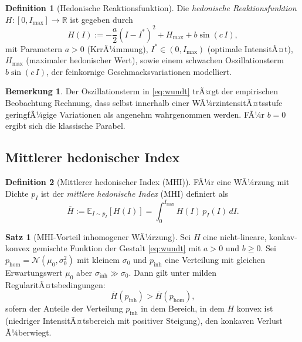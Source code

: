 ﻿\documentclass[12pt,a4paper]{article}
\theoremstyle{definition}
\newtheorem{definition}{Definition}[section]
\newtheorem{theorem}{Satz}[section]
\newtheorem{remark}{Bemerkung}[section]
\newcommand{\R}{\mathbb{R}}
\newcommand{\E}{\mathbb{E}}
\newcommand{\MHI}{\overline{H}}
\begin{document}
\begin{definition}[Hedonische Reaktionsfunktion]
Die \emph{hedonische Reaktionsfunktion} $H: [0, I_{\max}] \to \R$ ist
gegeben durch
\begin{equation}
  H(I) := -\frac{a}{2}(I - I^*)^2 + H_{\max} + b\sin(c\, I),
  \label{eq:wundt}
\end{equation}
mit Parametern $a > 0$ (KrrÃ¼mmung), $I^* \in (0, I_{\max})$ (optimale
IntensitÃ¤t), $H_{\max}$ (maximaler hedonischer Wert), sowie einem
schwachen Oszillationsterm $b\sin(c\, I)$, der feinkornige
Geschmacksvariationen modelliert.
\end{definition}

\begin{remark}
Der Oszillationsterm in \eqref{eq:wundt} trÃ¤gt der empirischen
Beobachtung Rechnung, dass selbst innerhalb einer WÃ¼rzintensitÃ¤tsstufe
geringfÃ¼gige Variationen als angenehm wahrgenommen werden. FÃ¼r
$b = 0$ ergibt sich die klassische Parabel.
\end{remark}

\subsection{Mittlerer hedonischer Index}

\begin{definition}[Mittlerer hedonischer Index (MHI)]
FÃ¼r eine WÃ¼rzung mit Dichte $p_I$ ist der \emph{mittlere hedonische
Index} (MHI) definiert als
\begin{equation}
  \MHI := \E_{I \sim p_I}[H(I)] = \int_0^{I_{\max}} H(I)\, p_I(I)\, dI.
  \label{eq:mhi}
\end{equation}
\end{definition}

\begin{theorem}[MHI-Vorteil inhomogener WÃ¼rzung]\label{thm:mhivorteil}
Sei $H$ eine nicht-lineare, konkav-konvex gemischte Funktion der
Gestalt \eqref{eq:wundt} mit $a > 0$ und $b \geq 0$.
Sei $p_{\mathrm{hom}} = \mathcal{N}(\mu_0, \sigma_0^2)$ mit kleinem
$\sigma_0$ und $p_{\mathrm{inh}}$ eine Verteilung mit gleichen
Erwartungswert $\mu_0$ aber $\sigma_{\mathrm{inh}} \gg \sigma_0$.
Dann gilt unter milden RegularitÃ¤tsbedingungen:
\[
  \MHI(p_{\mathrm{inh}}) > \MHI(p_{\mathrm{hom}}),
\]
sofern der Anteile der Verteilung $p_{\mathrm{inh}}$ in dem Bereich, in dem
$H$ konvex ist (niedriger IntensitÃ¤tsbereich mit positiver Steigung), den
konkaven Verlust Ã¼berwiegt.
\end{theorem}
\end{document}
